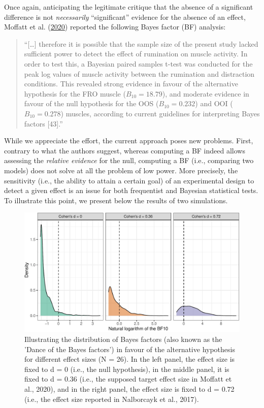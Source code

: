 \documentclass[
  english,
  man, donotrepeattitle,floatsintext]{apa6}
\begin{document}
Once again, anticipating the legitimate critique that the absence of a significant difference is not \emph{necessarily} ``significant'' evidence for the absence of an effect, Moffatt et al. (\protect\hyperlink{ref-moffatt_inner_2020}{2020}) reported the following Bayes factor (BF) analysis:

\begin{quote}
``{[}\ldots{]} therefore it is possible that the sample size of the present study lacked sufficient power to detect the effect of rumination on muscle activity. In order to test this, a Bayesian paired samples t-test was conducted for the peak log values of muscle activity between the rumination and distraction conditions. This revealed strong evidence in favour of the alternative hypothesis for the FRO muscle (\(B_{10} = 18.79\)), and moderate evidence in favour of the null hypothesis for the OOS (\(B_{10} = 0.232\)) and OOI (\(B_{10} = 0.278\)) muscles, according to current guidelines for interpreting Bayes factors {[}43{]}.''
\end{quote}

While we appreciate the effort, the current approach poses new problems. First, contrary to what the authors suggest, whereas computing a BF indeed allows assessing the \emph{relative evidence} for the null, computing a BF (i.e., comparing two models) does not solve at all the problem of low power. More precisely, the sensitivity (i.e., the ability to attain a certain goal) of an experimental design to detect a given effect is an issue for both frequentist and Bayesian statistical tests. To illustrate this point, we present below the results of two simulations.

\begin{figure}[!htb]

{\centering \includegraphics[width=1\linewidth]{manuscript_files/figure-latex/bf-dance-1} 

}

\caption{Illustrating the distribution of Bayes factors (also known as the 'Dance of the Bayes factors') in favour of the alternative hypothesis for different effect sizes (N = 26). In the left panel, the effect size is fixed to d = 0 (i.e., the null hypothesis), in the middle panel, it is fixed to d = 0.36 (i.e., the supposed target effect size in Moffatt et al., 2020), and in the right panel, the effect size is fixed to d = 0.72 (i.e., the effect size reported in Nalborcayk et al., 2017).}\label{fig:bf-dance}
\end{figure}
\end{document}
